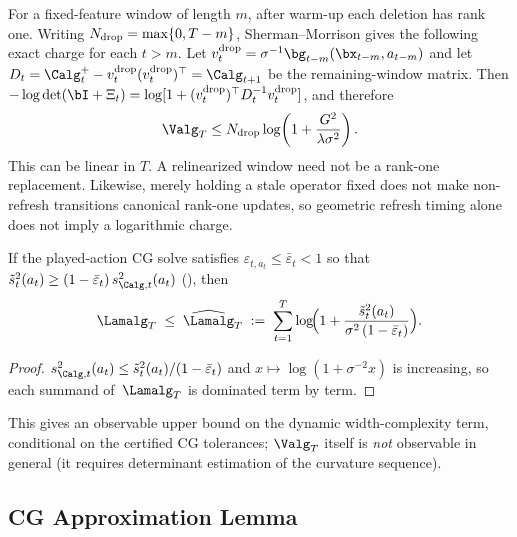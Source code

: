 For a fixed-feature window of length $m$, after warm-up each deletion has
rank one.  Writing $N_{\rm drop}=\max\{0,T-m\}$, Sherman--Morrison gives the
following exact charge for each $t>m$.  Let
$v_t^{\rm drop}=\sigma^{-1}\bg_{t-m}(\bx_{t-m},a_{t-m})$ and let
$D_t=\Calg_t^+-v_t^{\rm drop}(v_t^{\rm drop})^\top=\Calg_{t+1}$ be the
remaining-window matrix.  Then
$-\log\det(\bI+\Xi_t)=
\log[1+(v_t^{\rm drop})^\top D_t^{-1}v_t^{\rm drop}]$, and therefore
\[
 \Valg_T\le N_{\rm drop}\log\!\left(1+\frac{G^2}{\lambda\sigma^2}\right).
\]
This can be linear in $T$.  A relinearized window need not be a rank-one
replacement.  Likewise, merely holding a stale operator fixed does not make
non-refresh transitions canonical rank-one updates, so geometric refresh timing
alone does not imply a logarithmic charge.

\begin{corollary}\label{cor:lam-observable}
If the played-action CG solve satisfies $\varepsilon_{t,a_t}\le\bar\varepsilon_t<1$
so that $\tilde s_t^2(a_t)\ge(1-\bar\varepsilon_t)\,s_{\Calg,t}^2(a_t)$
(), then
\begin{equation}\label{eq:lam-observable}
  \Lamalg_T
  \;\le\;
  \widehat{\Lamalg}_T
  \;:=\;
  \sum_{t=1}^T
  \log\!\Bigl(1+\frac{\tilde s_t^2(a_t)}{\sigma^2\,(1-\bar\varepsilon_t)}\Bigr).
\end{equation}
\end{corollary}
\begin{proof}
$s_{\Calg,t}^2(a_t)\le\tilde s_t^2(a_t)/(1-\bar\varepsilon_t)$ and
$x\mapsto\log(1+\sigma^{-2}x)$ is increasing, so each summand
of~$\Lamalg_T$ is dominated term by term.
\end{proof}

\noindent
This gives an observable upper bound on the dynamic width-complexity term,
conditional on the certified CG tolerances; $\Valg_T$ itself is \emph{not}
observable in general (it requires determinant estimation of the curvature
sequence).



\subsection{CG Approximation Lemma}

